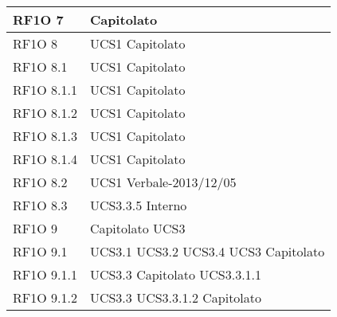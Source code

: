 \begin{center}
\begin{longtable}{ | p{5cm} | p{5cm} |}
        RF1O 7 &  Capitolato \newline  \\ \hline      
        RF1O 8  &  UCS1 \newline  Capitolato \newline  \\ \hline      
        RF1O 8.1  &  UCS1 \newline  Capitolato \newline  \\ \hline      
        RF1O 8.1.1  &  UCS1 \newline  Capitolato \newline  \\ \hline      
        RF1O 8.1.2 &  UCS1 \newline  Capitolato \newline  \\ \hline      
        RF1O 8.1.3  &  UCS1 \newline  Capitolato \newline  \\ \hline      
        RF1O 8.1.4  &  UCS1 \newline  Capitolato \newline  \\ \hline      
        RF1O 8.2  &  UCS1 \newline  Verbale-2013/12/05 \newline  \\ \hline      
        RF1O 8.3 &  UCS3.3.5 \newline  Interno \newline  \\ \hline      
        RF1O 9  &  Capitolato \newline  UCS3 \newline  \\ \hline      
        RF1O 9.1  &  UCS3.1 \newline  UCS3.2 \newline  UCS3.4 \newline  UCS3 \newline  Capitolato \newline  \\ \hline      
        RF1O 9.1.1  &  UCS3.3 \newline  Capitolato \newline  UCS3.3.1.1 \newline  \\ \hline      
        RF1O 9.1.2  &  UCS3.3 \newline  UCS3.3.1.2 \newline  Capitolato \newline  \\ \hline      

\end{longtable}
\end{center}
